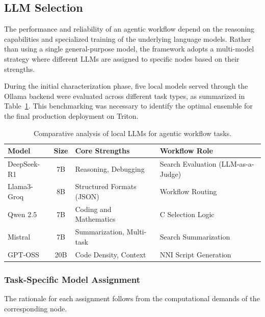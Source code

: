 \subsection{LLM Selection}
\label{sec:llm_selection}
The performance and reliability of an agentic workflow depend on the reasoning capabilities and specialized training of the underlying language models. Rather than using a single general-purpose model, the framework adopts a multi-model strategy where different LLMs are assigned to specific nodes based on their strengths.

During the initial characterization phase, five local models served through the Ollama backend were evaluated across different task types, as summarized in Table~\ref{tab:llm_comparison}. This benchmarking was necessary to identify the optimal ensemble for the final production deployment on Triton.

\begin{table}[h]
    \centering
    \caption{Comparative analysis of local LLMs for agentic workflow tasks.}
    \label{tab:llm_comparison}
    \begin{tabular}{|l|c|l|l|}
        \hline
        \textbf{Model} & \textbf{Size} & \textbf{Core Strengths}   & \textbf{Workflow Role}          \\
        \hline
        DeepSeek-R1    & 7B            & Reasoning, Debugging      & Search Evaluation (LLM-as-a-Judge) \\
        Llama3-Groq    & 8B            & Structured Formats (JSON) & Workflow Routing                \\
        Qwen 2.5       & 7B            & Coding and Mathematics    & C Selection Logic               \\
        Mistral        & 7B            & Summarization, Multi-task & Search Summarization            \\
        GPT-OSS        & 20B           & Code Density, Context     & NNI Script Generation           \\
        \hline
    \end{tabular}
\end{table}

\subsubsection{Task-Specific Model Assignment}

The rationale for each assignment follows from the computational demands of the corresponding node.

